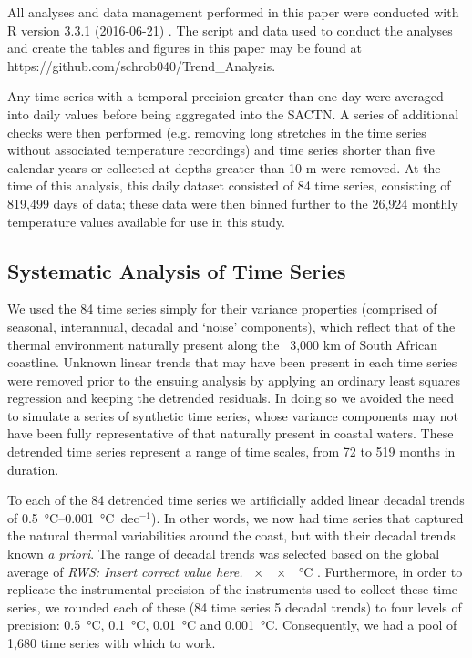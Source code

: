 \documentclass{ametsoc}
\begin{document}
All analyses and data management performed in this paper were conducted with R version 3.3.1 (2016-06-21) \citep{R}. The script and data used to conduct the analyses and create the tables and figures in this paper may be found at https://github.com/schrob040/Trend_Analysis.

Any time series with a temporal precision greater than one day were averaged into daily values before being aggregated into the SACTN. A series of additional checks were then performed (e.g. removing long stretches in the time series without associated temperature recordings) and time series shorter than five calendar years or collected at depths greater than 10 m were removed. At the time of this analysis, this daily dataset consisted of 84 time series, consisting of 819,499 days of data; these data were then binned further to the 26,924 monthly temperature values available for use in this study.

\subsection{Systematic Analysis of Time Series}
We used the 84 time series simply for their variance properties (comprised of seasonal, interannual, decadal and ‘noise’ components), which reflect that of the thermal environment naturally present along the ~3,000 km of South African coastline. Unknown linear trends that may have been present in each time series were removed prior to the ensuing analysis by applying an ordinary least squares regression and keeping the detrended residuals. In doing so we avoided the need to simulate a series of synthetic time series, whose variance components may not have been fully representative of that naturally present in coastal waters. These detrended time series represent a range of time scales, from 72 to 519 months in duration.

To each of the 84 detrended time series we artificially added linear decadal trends of \SIrange{0.5}{0.001}{\degreeCelsius}~dec$^{-1}$). In other words, we now had time series that captured the natural thermal variabilities around the coast, but with their decadal trends known \emph{a priori}. The range of decadal trends was selected based on the global average of \emph{RWS: Insert correct value here.} \SI{xx}{\degreeCelsius} \citep{IPCC2013}. Furthermore, in order to replicate the instrumental precision of the instruments used to collect these time series, we rounded each of these (84 time series \texttimes{} 5 decadal trends) to four levels of precision: \SI{0.5}{\degreeCelsius}, \SI{0.1}{\degreeCelsius}, \SI{0.01}{\degreeCelsius} and \SI{0.001}{\degreeCelsius}. Consequently, we had a pool of 1,680 time series with which to work.
\end{document}

